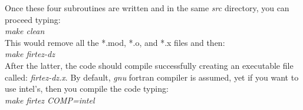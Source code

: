 Once these four subroutines are written and in the same {\it src} directory, you can proceed typing:\\
{\it make clean}\\
This would remove all the *.mod, *.o, and *.x files and then:\\
{\it make firtez-dz}\\
After the latter, the code should compile successfully creating an executable file called: {\it firtez-dz.x}. By default, {\it gnu} fortran compiler is assumed, yet if you want to use intel's, then you compile the code typing:\\
{\it make firtez COMP=intel}\\


%